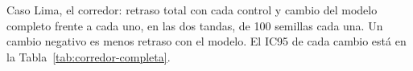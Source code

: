 \begin{table}[!tbp]
\centering
\footnotesize
\setlength{\tabcolsep}{3pt}

\caption[Caso Lima, el corredor: retraso total con cada control]{Caso Lima, el corredor: retraso total con cada control y cambio del modelo completo frente a cada uno, en las dos tandas, de 100 semillas cada una. Un cambio negativo es menos retraso con el modelo. El IC95 de cada cambio está en la Tabla~\ref{tab:corredor-completa}.}
\label{tab:corredor-resultado}
\end{table}

